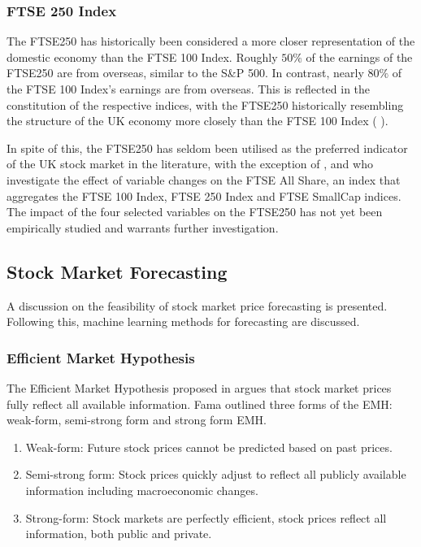 \documentclass[11pt,a4paper]{article}
\newcommand{\citeboth}[1]{\citeauthor{#1} \citep{#1}}
\begin{document}
\subsubsection{FTSE 250 Index}

The FTSE250 has historically been considered a more closer representation of the domestic economy than the FTSE 100 Index. Roughly $50\%$ of the earnings of the FTSE250 are from overseas, similar to the S\&P 500. In contrast, nearly $80\%$ of the FTSE 100 Index's earnings are from overseas. 
This is reflected in the constitution of the respective indices, with the 
FTSE250 historically resembling the structure of the UK economy more closely than the FTSE 100 Index (\citeboth{ftse250history}).

In spite of this, the FTSE250 has seldom been utilised as the preferred indicator of the UK stock market in the literature,
with the exception of \citeboth{smit2023longrun}, \citeboth{khatri2024impact} and \citeboth{engstrom2006impact} who investigate the effect of variable changes on the FTSE All Share, an index that aggregates the 
FTSE 100 Index, FTSE 250 Index and FTSE SmallCap indices. The impact of the four selected variables on the FTSE250 has not yet been empirically studied and 
warrants further investigation.


\subsection{Stock Market Forecasting}

A discussion on the feasibility of stock market price forecasting is presented. Following this, machine learning methods for forecasting are 
discussed.


\subsubsection{Efficient Market Hypothesis}

The Efficient Market Hypothesis proposed in \citeboth{fama1970} argues that stock market prices fully 
reflect all available information. Fama outlined three forms of the EMH:
weak-form, semi-strong form and strong form EMH.
\begin{enumerate}
    \item Weak-form: Future stock prices cannot be predicted based on past prices.
    \item Semi-strong form: Stock prices quickly adjust to reflect all publicly available information including macroeconomic changes.  
    \item Strong-form: Stock markets are perfectly efficient, stock prices reflect all information, both public and private.
\end{enumerate}
\end{document}
